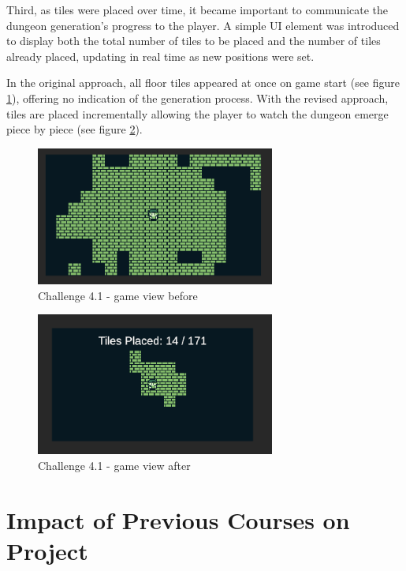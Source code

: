 \documentclass[a4paper, 12pt, one column, aas_macros]{article}
\begin{document}
Third, as tiles were placed over time, it became important to communicate the dungeon generation's progress to the player. A simple UI element was introduced to display both the total number of tiles to be placed and the number of tiles already placed, updating in real time as new positions were set.

In the original approach, all floor tiles appeared at once on game start (see figure \ref{fig:difficulty-1-before}), offering no indication of the generation process. With the revised approach, tiles are placed incrementally allowing the player to watch the dungeon emerge piece by piece (see figure \ref{fig:difficulty-1-after}).

\begin{figure}[htbp]
  \centering
  \includegraphics[width=0.7\textwidth]{images/difficulty-1-before.png}
  \caption{Challenge 4.1 - game view before}
  \label{fig:difficulty-1-before}
\end{figure}

\begin{figure}[htbp]
  \centering
  \includegraphics[width=0.7\textwidth]{images/difficulty-1-after.png}
  \caption{Challenge 4.1 - game view after}
  \label{fig:difficulty-1-after}
\end{figure}

\section{Impact of Previous Courses on Project}
\end{document}
